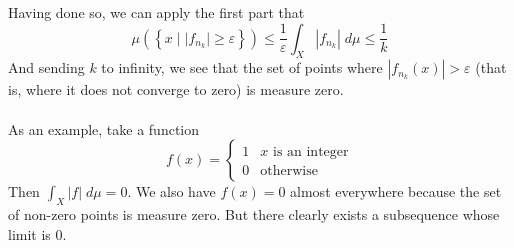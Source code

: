 \documentclass[12pt]{article}
\theoremstyle{plain}
\theoremstyle{definition}
\theoremstyle{remark}
\begin{document}
\begin{enumerate}
Having done so, we can apply the first part that
\[
    \mu\left(\left\{ x\; | \; |f_{n_k}|\geq \varepsilon \right\}\right) 
    \leq \frac{1}{\varepsilon} \int_X |f_{n_k}| \; d\mu 
    \leq \frac{1}{k}
\]
And sending $k$ to infinity, we see that the set of points where $|f_{n_k}(x)| >\varepsilon$ (that is, where it does not converge to zero) is measure zero.
\\
\\
As an example, take a function
\[
    f(x) = \begin{cases} 1 & \text{$x$ is an integer} \\ 0 & \text{otherwise} \end{cases}
\]
Then $\int_X |f| \; d\mu=0$. We also have $f(x)=0$ almost everywhere because the set of non-zero points is measure zero. But there clearly exists a subsequence whose limit is 0.



\end{enumerate}
\end{document}
